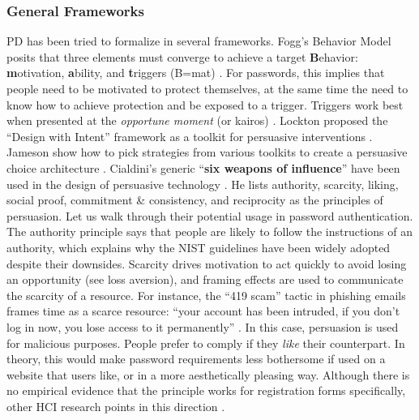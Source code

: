 	\subsubsection{General Frameworks}
	\gls{PD} has been tried to formalize in several frameworks. Fogg's Behavior Model posits that three elements must converge to achieve a target \textbf{B}ehavior: \textbf{m}otivation, \textbf{a}bility, and \textbf{t}riggers (B=mat) \cite{Fogg2009BehavioralModel}. For passwords, this implies that people need to be motivated to protect themselves, at the same time the need to know how to achieve protection and be exposed to a trigger. Triggers work best when presented at the \textit{opportune moment} (or kairos) \cite{Lockton2010DesignWithIntent}.  %
	Lockton \etal proposed the ``Design with Intent'' framework as a toolkit for persuasive interventions \cite{Lockton2010DesignWithIntent}. Jameson \etal show how to pick strategies from various toolkits to create a persuasive choice architecture \cite{Jameson2011PreferentialChoice}. 
	Cialdini's generic ``\textbf{six weapons of influence}'' have been used in the design of persuasive technology \cite{Cialdini2007Influence}. He lists authority, scarcity, liking, social proof, commitment \& consistency, and reciprocity as the principles of persuasion. Let us walk through their potential usage in password authentication. 
	The authority principle says that people are likely to follow the instructions of an authority, which explains why the \gls{NIST} guidelines have been widely adopted despite their downsides. 
	Scarcity drives motivation to act quickly to avoid losing an opportunity (see loss aversion), and framing effects are used to communicate the scarcity of a resource. For instance, the ``419 scam'' tactic in phishing emails frames time as a scarce resource: ``your account has been intruded, if you don't log in now, you lose access to it permanently'' \cite{Stajano2011Principles}. In this case, persuasion is used for malicious purposes. 
	People prefer to comply if they \textit{like} their counterpart. In theory, this would make password requirements less bothersome if used on a website that users like, or in a more aesthetically pleasing way. Although there is no empirical evidence that the principle works for registration forms specifically, other HCI research points in this direction \cite{Tractinsky2000WhatIsBeautiful, Fogg2001WhatMakesSitesCredible}. %
